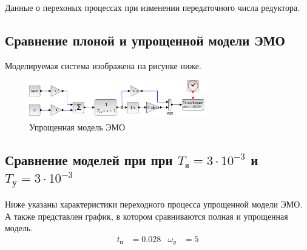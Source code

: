 \documentclass[a4paper, 12pt]{article}
\begin{document}
\begin{table}[h!]
    \centering
    \begin{threeparttable}
        \caption{Данные о перехоных процессах при изменении передаточного числа редуктора.}
        \end{threeparttable}
\end{table}

\newpage
\begin{center}
\section{Сравнение плоной и упрощенной модели ЭМО}
\end{center}

Моделируемая система изображена на рисунке ниже.

\begin{figure}[h!]
    \centering
    \includegraphics[width = 0.7\textwidth]{images/EasyModel/easy-model.pdf}
    \caption{Упрощенная модель ЭМО}
\end{figure}

\subsection{Сравнение моделей при при $T_\text{я} = 3\cdot10^{-3}$ и $T_\text{у} = 3\cdot10^{-3}$}
Ниже указаны характеристики переходного процесса упрощенной модели ЭМО. А также представлен график, в котором сравниваются полная и упрощенная модель.
\begin{align*}
    t_\text{п} & = 0.028 & \omega_y & = 5 \\
\end{align*}
\end{document}
